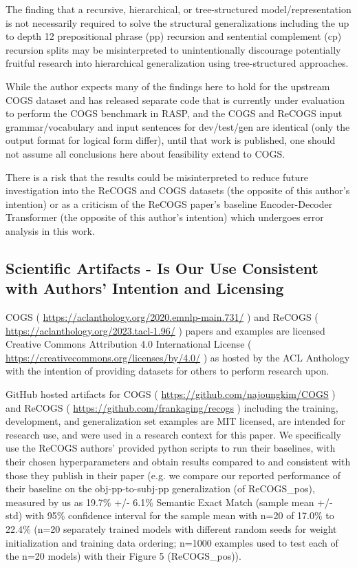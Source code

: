 \documentclass[11pt]{article}
\begin{document}
The finding that a recursive, hierarchical, or tree-structured model/representation is not necessarily required to solve the structural generalizations including the up to depth 12 prepositional phrase (pp) recursion and sentential complement (cp) recursion splits may be misinterpreted to unintentionally discourage potentially fruitful research into hierarchical generalization using tree-structured approaches.

While the author expects many of the findings here to hold for the upstream COGS dataset and has released separate code that is currently under evaluation to perform the COGS benchmark in RASP, and the COGS and ReCOGS input grammar/vocabulary and input sentences for dev/test/gen are identical (only the output format for logical form differ), until that work is published, one should not assume all conclusions here about feasibility extend to COGS.

There is a risk that the results could be misinterpreted to reduce future investigation into the ReCOGS and COGS datasets (the opposite of this author’s intention) or as a criticism of the ReCOGS paper's baseline Encoder-Decoder Transformer (the opposite of this author's intention) which undergoes error analysis in this work.

\subsection{Scientific Artifacts - Is Our Use Consistent with Authors' Intention and Licensing}
\label{scientific_artifacts_use}

COGS \citep{KimLinzen2020} ( \href{https://aclanthology.org/2020.emnlp-main.731/}{https://aclanthology.org/2020.emnlp-main.731/} ) and ReCOGS \citep{Wu2023} ( \href{https://aclanthology.org/2023.tacl-1.96/}{https://aclanthology.org/2023.tacl-1.96/} ) papers and examples are licensed Creative Commons Attribution 4.0 International License ( \href{https://creativecommons.org/licenses/by/4.0/}{https://creativecommons.org/licenses/by/4.0/} ) as hosted by the ACL Anthology with the intention of providing datasets for others to perform research upon.

GitHub hosted artifacts for COGS ( \href{https://github.com/najoungkim/COGS}{https://github.com/najoungkim/COGS}  ) and ReCOGS ( \href{https://github.com/frankaging/recogs}{https://github.com/frankaging/recogs} ) including the training, development, and generalization set examples are MIT licensed, are intended for research use, and were used in a research context for this paper. We specifically use the ReCOGS authors' provided python scripts to run their baselines, with their chosen hyperparameters and obtain results compared to and consistent with those they publish in their paper (e.g. we compare our reported performance of their baseline on the obj-pp-to-subj-pp generalization (of ReCOGS\_pos), measured by us as 19.7\% +/- 6.1\% Semantic Exact Match (sample mean +/- std) with 95\% confidence interval for the sample mean with n=20 of 17.0\% to 22.4\% (n=20 separately trained models with different random seeds for weight initialization and training data ordering; n=1000 examples used to test each of the n=20 models) with their Figure 5 (ReCOGS\_pos)).
\end{document}

